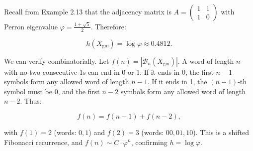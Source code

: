 \begin{example}
Recall from Example 2.13 that the adjacency matrix is $A = \begin{pmatrix} 1 & 1 \\ 1 & 0 \end{pmatrix}$ with Perron eigenvalue $\varphi = \frac{1+\sqrt{5}}{2}$. Therefore:

\[
h(X_{\text{gm}}) = \log \varphi \approx 0.4812.
\]

We can verify combinatorially. Let $f(n) = |\mathcal{B}_n(X_{\text{gm}})|$. A word of length $n$ with no two consecutive 1s can end in 0 or 1. If it ends in 0, the first $n-1$ symbols form any allowed word of length $n-1$. If it ends in 1, the $(n-1)$-th symbol must be 0, and the first $n-2$ symbols form any allowed word of length $n-2$. Thus:

\[
f(n) = f(n-1) + f(n-2),
\]

with $f(1) = 2$ (words: $0, 1$) and $f(2) = 3$ (words: $00, 01, 10$). This is a shifted Fibonacci recurrence, and $f(n) \sim C \cdot \varphi^n$, confirming $h = \log \varphi$.
\end{example}

